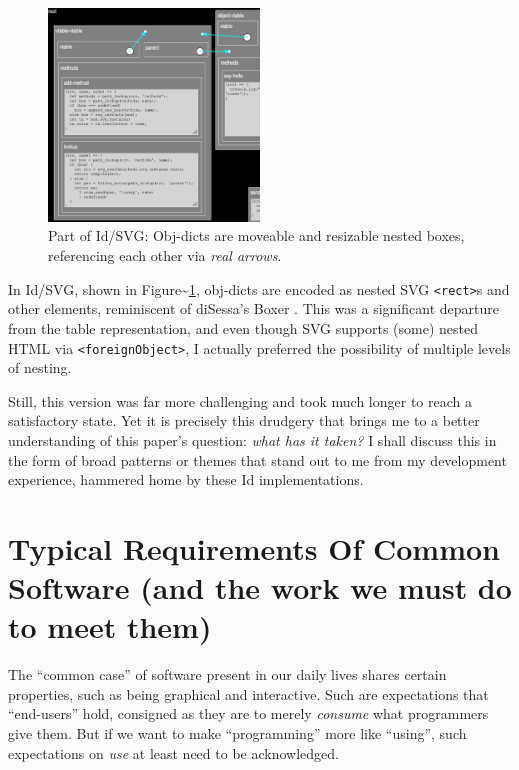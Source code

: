\begin{figure}[h]
  \centering
  \includegraphics[width=0.5\textwidth]{orom-svg.png}
  \caption{Part of Id{}/SVG: Obj-dicts are moveable and resizable nested boxes,
           referencing each other via \emph{real arrows}.\label{fig:orom-svg}}
\end{figure}

In Id{}/SVG, shown in Figure\textasciitilde{}\ref{fig:orom-svg},
obj-dicts are encoded as nested SVG
\texttt{\textless{}rect\textgreater{}}s and other elements, reminiscent
of diSessa's Boxer \cite{boxer}. This was a significant departure from
the table representation, and even though SVG supports (some) nested
HTML via \texttt{\textless{}foreignObject\textgreater{}}, I actually
preferred the possibility of multiple levels of nesting.

Still, this version was far more challenging and took much longer to
reach a satisfactory state. Yet it is precisely this drudgery that
brings me to a better understanding of this paper's question: \emph{what
has it taken?} I shall discuss this in the form of broad patterns or
themes that stand out to me from my development experience, hammered
home by these Id{} implementations.

\hypertarget{typical-requirements-of-common-software-and-the-work-we-must-do-to-meet-them}{%
\section{Typical Requirements Of Common Software (and the work we must
do to meet
them)}\label{typical-requirements-of-common-software-and-the-work-we-must-do-to-meet-them}}

The ``common case'' of software present in our daily lives shares
certain properties, such as being graphical and interactive. Such are
expectations that ``end-users'' hold, consigned as they are to merely
\emph{consume} what programmers give them. But if we want to make
``programming'' more like ``using'', such expectations on \emph{use} at
least need to be acknowledged.

